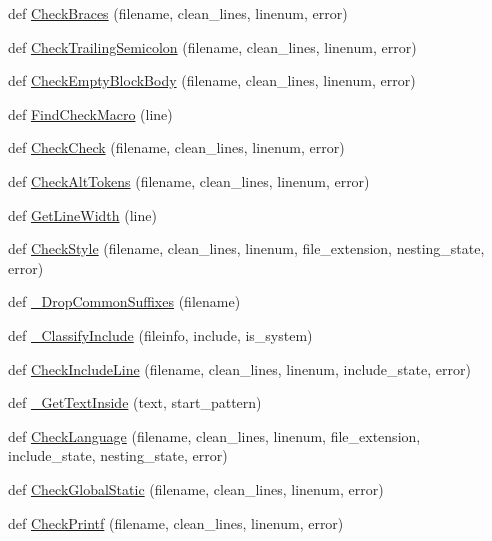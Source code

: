 \begin{DoxyCompactItemize}
\item 
def \hyperlink{namespacecpplint_a3f0a4d2ab1846bf487c742dc88946e3e}{Check\+Braces} (filename, clean\+\_\+lines, linenum, error)
\item 
def \hyperlink{namespacecpplint_a725663cb5a341fbf726f2ac8fa4e61a3}{Check\+Trailing\+Semicolon} (filename, clean\+\_\+lines, linenum, error)
\item 
def \hyperlink{namespacecpplint_a9c8aa68644d8cb55497a7d9cb8fb12d1}{Check\+Empty\+Block\+Body} (filename, clean\+\_\+lines, linenum, error)
\item 
def \hyperlink{namespacecpplint_aefff9c2eefe99656a226d11ce4d9b555}{Find\+Check\+Macro} (line)
\item 
def \hyperlink{namespacecpplint_afc5b544f640cd11be2665e6bb4646de7}{Check\+Check} (filename, clean\+\_\+lines, linenum, error)
\item 
def \hyperlink{namespacecpplint_a47f66a697e177c06b56491613fbc2d38}{Check\+Alt\+Tokens} (filename, clean\+\_\+lines, linenum, error)
\item 
def \hyperlink{namespacecpplint_ae55f74f34d41b59cf262511c5944209a}{Get\+Line\+Width} (line)
\item 
def \hyperlink{namespacecpplint_acfc546daa5947842cb01af319dcb482b}{Check\+Style} (filename, clean\+\_\+lines, linenum, file\+\_\+extension, nesting\+\_\+state, error)
\item 
def \hyperlink{namespacecpplint_af644bfa65494e90ea688096bfc07e4b5}{\+\_\+\+Drop\+Common\+Suffixes} (filename)
\item 
def \hyperlink{namespacecpplint_a59a205a55686569a1782f09ac657eff2}{\+\_\+\+Classify\+Include} (fileinfo, include, is\+\_\+system)
\item 
def \hyperlink{namespacecpplint_add7eb8486a182205bb86de635db01384}{Check\+Include\+Line} (filename, clean\+\_\+lines, linenum, include\+\_\+state, error)
\item 
def \hyperlink{namespacecpplint_aa9854b8b589b54004fe00ddab7cef87e}{\+\_\+\+Get\+Text\+Inside} (text, start\+\_\+pattern)
\item 
def \hyperlink{namespacecpplint_a6992d951cf4be06500f6b392ee6a8111}{Check\+Language} (filename, clean\+\_\+lines, linenum, file\+\_\+extension, include\+\_\+state, nesting\+\_\+state, error)
\item 
def \hyperlink{namespacecpplint_a64fc322bcf08988b43f003ff495fbabb}{Check\+Global\+Static} (filename, clean\+\_\+lines, linenum, error)
\item 
def \hyperlink{namespacecpplint_aaa8b988b9e83ad1c8964ecc0739d52e5}{Check\+Printf} (filename, clean\+\_\+lines, linenum, error)

\end{DoxyCompactItemize}
